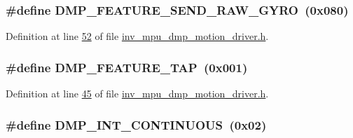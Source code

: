 \subsubsection[{\texorpdfstring{D\+M\+P\+\_\+\+F\+E\+A\+T\+U\+R\+E\+\_\+\+S\+E\+N\+D\+\_\+\+R\+A\+W\+\_\+\+G\+Y\+RO}{DMP_FEATURE_SEND_RAW_GYRO}}]{\setlength{\rightskip}{0pt plus 5cm}\#define D\+M\+P\+\_\+\+F\+E\+A\+T\+U\+R\+E\+\_\+\+S\+E\+N\+D\+\_\+\+R\+A\+W\+\_\+\+G\+Y\+RO~(0x080)}\hypertarget{group___d_r_i_v_e_r_s_gaa59d3ed6f0cbc66e99ce637546434b34}{}\label{group___d_r_i_v_e_r_s_gaa59d3ed6f0cbc66e99ce637546434b34}


Definition at line \hyperlink{inv__mpu__dmp__motion__driver_8h_source_l00052}{52} of file \hyperlink{inv__mpu__dmp__motion__driver_8h_source}{inv\+\_\+mpu\+\_\+dmp\+\_\+motion\+\_\+driver.\+h}.

\subsubsection[{\texorpdfstring{D\+M\+P\+\_\+\+F\+E\+A\+T\+U\+R\+E\+\_\+\+T\+AP}{DMP_FEATURE_TAP}}]{\setlength{\rightskip}{0pt plus 5cm}\#define D\+M\+P\+\_\+\+F\+E\+A\+T\+U\+R\+E\+\_\+\+T\+AP~(0x001)}\hypertarget{group___d_r_i_v_e_r_s_ga87fac39cf95e2c56afdf507a986fa00b}{}\label{group___d_r_i_v_e_r_s_ga87fac39cf95e2c56afdf507a986fa00b}


Definition at line \hyperlink{inv__mpu__dmp__motion__driver_8h_source_l00045}{45} of file \hyperlink{inv__mpu__dmp__motion__driver_8h_source}{inv\+\_\+mpu\+\_\+dmp\+\_\+motion\+\_\+driver.\+h}.

\subsubsection[{\texorpdfstring{D\+M\+P\+\_\+\+I\+N\+T\+\_\+\+C\+O\+N\+T\+I\+N\+U\+O\+US}{DMP_INT_CONTINUOUS}}]{\setlength{\rightskip}{0pt plus 5cm}\#define D\+M\+P\+\_\+\+I\+N\+T\+\_\+\+C\+O\+N\+T\+I\+N\+U\+O\+US~(0x02)}\hypertarget{group___d_r_i_v_e_r_s_gaabccda0e9ccd1a2f4287d23fe4b0c776}{}\label{group___d_r_i_v_e_r_s_gaabccda0e9ccd1a2f4287d23fe4b0c776}


